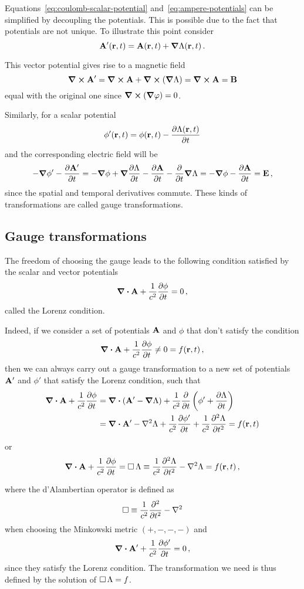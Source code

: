 \documentclass[class=report, crop=false]{standalone}
\begin{document}
Equations~\eqref{eq:coulomb-scalar-potential} and~\eqref{eq:ampere-potentials}
can be simplified by decoupling the potentials. This is possible due to the fact
that potentials are not unique. To illustrate this point consider
\[
  \vb{A}'(\vb{r},t) = \vb{A}(\vb{r},t) + \grad{\Lambda}(\vb{r},t)\,.
\]

This vector potential gives rise to a magnetic field
\[
  \curl{\vb{A}'} = \curl{\vb{A}} + \curl(\grad{\Lambda}) = \curl{\vb{A}} = \vb{B}
\]
equal with the original one since \( \curl(\grad{\varphi}) = 0 \).

Similarly, for a scalar potential
\[
  \phi'(\vb{r},t) = \phi(\vb{r},t) - \pdv{\Lambda(\vb{r},t)}{t}
\]
and the corresponding electric field will be
\[
  - \grad{\phi'} - \pdv{\vb{A'}}{t} =
  - \grad{\phi} + \grad{\pdv{\Lambda}{t}} - \pdv{\vb{A}}{t} - \pdv{t} \grad{\Lambda}
  = - \grad{\phi} - \pdv{\vb{A}}{t}
  = \vb{E}\,,
\]
since the spatial and temporal derivatives commute. These kinds of transformations
are called gauge transformations.

\subsection{Gauge transformations}

The freedom of choosing the gauge leads to the following condition satisfied by
the scalar and vector potentials
\[
  \div{\vb{A}} + \frac{1}{c^2}\pdv{\phi}{t} = 0\,,
\]
called the Lorenz condition.

Indeed, if we consider a set of potentials \(\vb{A}\) and \(\phi\) that
don't satisfy the condition
\[
  \div{\vb{A}} + \frac{1}{c^2}\pdv{\phi}{t} \ne 0 = f(\vb{r},t)\,,
\]
then we can always carry out a gauge transformation to a new set of potentials
\(\vb{A}'\) and \(\phi'\) that satisfy the Lorenz condition, such that
\begin{align*}
  \div{\vb{A}} + \frac{1}{c^2}\pdv{\phi}{t} &= \div(\vb{A}' - \grad{\Lambda})
    + \frac{1}{c^2}\pdv{t} \left( \phi' + \pdv{\Lambda}{t} \right) \\
    &= \div{\vb{A}'} - \laplacian{\Lambda} + \frac{1}{c^2}\pdv{\phi'}{t}
    + \frac{1}{c^2}\pdv[2]{\Lambda}{t}
    = f(\vb{r},t)
\end{align*}

or
\[
  \div{\vb{A}} + \frac{1}{c^2}\pdv{\phi}{t} =
  \dalambert \Lambda \equiv \frac{1}{c^2}\pdv[2]{\Lambda}{t} - \laplacian{\Lambda} = f(\vb{r},t)\,,
\]

where the d'Alambertian operator is defined as
\[
  \dalambert \equiv \frac{1}{c^2}\pdv[2]{t} - \laplacian
\]
when choosing the Minkowski metric \( (+,-,-,-) \) and
\[
  \div{\vb{A'}} + \frac{1}{c^2}\pdv{\phi'}{t} = 0\,,
\]
since they satisfy the Lorenz condition.
The transformation we need is thus defined by the solution of \(\operatorname{\Box} \Lambda = f\).
\end{document}
